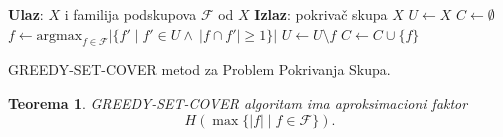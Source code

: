 \documentclass[a4paper, utf8, 11pt, colorlinks]{book}
\newtheorem{thm}{Teorema}
\begin{document}
\begin{algorithm}[!t] 
	\begin{algorithmic}[1]
		\STATE \textbf{Ulaz}: $X$ i familija podskupova $\mathcal{F}$ od $X$
		\STATE \textbf{Izlaz}: pokrivač skupa $X$
		\STATE $U \gets X$
		\STATE $C \gets \emptyset$
		\STATE $f \gets \mbox{argmax}_{f \in \mathcal{F}} |\{ f' \mid f' \in U  \wedge\ |f \cap f'| \geq 1\}| $
		\STATE $U \gets U \setminus f$
		\STATE $C \gets C \cup \{f\}$
		\ENDWHILE
	\end{algorithmic}
	\caption{GREEDY-SET-COVER metod za Problem Pokrivanja Skupa.}
    \label{alg:set-cover-gridi}
\end{algorithm}

\begin{thm}
	  GREEDY-SET-COVER algoritam ima aproksimacioni faktor 
	$$ H(\max\{|f| \mid f \in \mathcal{F}\}).$$
	
\end{thm}
\end{document}
